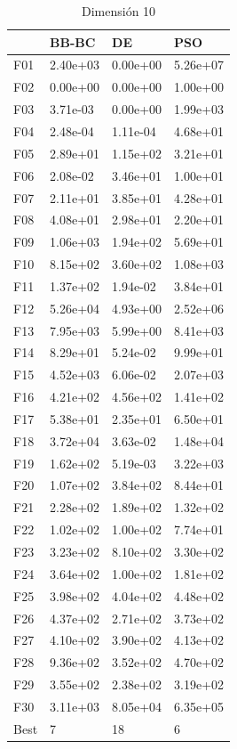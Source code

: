 \begin{table}[H]
    \begin{minipage}{.5\linewidth}
      \caption{Dimensión 10}
      \centering
      \begin{tabular}{llll}
        \toprule
        {} &     BB-BC &        DE &       PSO \\
        \midrule
        F01  &  2.40e+03 &  0.00e+00 &  5.26e+07 \\
        F02  &  0.00e+00 &  0.00e+00 &  1.00e+00 \\
        F03  &  3.71e-03 &  0.00e+00 &  1.99e+03 \\
        F04  &  2.48e-04 &  1.11e-04 &  4.68e+01 \\
        F05  &  2.89e+01 &  1.15e+02 &  3.21e+01 \\
        F06  &  2.08e-02 &  3.46e+01 &  1.00e+01 \\
        F07  &  2.11e+01 &  3.85e+01 &  4.28e+01 \\
        F08  &  4.08e+01 &  2.98e+01 &  2.20e+01 \\
        F09  &  1.06e+03 &  1.94e+02 &  5.69e+01 \\
        F10  &  8.15e+02 &  3.60e+02 &  1.08e+03 \\
        F11  &  1.37e+02 &  1.94e-02 &  3.84e+01 \\
        F12  &  5.26e+04 &  4.93e+00 &  2.52e+06 \\
        F13  &  7.95e+03 &  5.99e+00 &  8.41e+03 \\
        F14  &  8.29e+01 &  5.24e-02 &  9.99e+01 \\
        F15  &  4.52e+03 &  6.06e-02 &  2.07e+03 \\
        F16  &  4.21e+02 &  4.56e+02 &  1.41e+02 \\
        F17  &  5.38e+01 &  2.35e+01 &  6.50e+01 \\
        F18  &  3.72e+04 &  3.63e-02 &  1.48e+04 \\
        F19  &  1.62e+02 &  5.19e-03 &  3.22e+03 \\
        F20  &  1.07e+02 &  3.84e+02 &  8.44e+01 \\
        F21  &  2.28e+02 &  1.89e+02 &  1.32e+02 \\
        F22  &  1.02e+02 &  1.00e+02 &  7.74e+01 \\
        F23  &  3.23e+02 &  8.10e+02 &  3.30e+02 \\
        F24  &  3.64e+02 &  1.00e+02 &  1.81e+02 \\
        F25  &  3.98e+02 &  4.04e+02 &  4.48e+02 \\
        F26  &  4.37e+02 &  2.71e+02 &  3.73e+02 \\
        F27  &  4.10e+02 &  3.90e+02 &  4.13e+02 \\
        F28  &  9.36e+02 &  3.52e+02 &  4.70e+02 \\
        F29  &  3.55e+02 &  2.38e+02 &  3.19e+02 \\
        F30  &  3.11e+03 &  8.05e+04 &  6.35e+05 \\
        Best &         7 &        18 &         6 \\
        \bottomrule
        \end{tabular}
        

\end{minipage}
\end{table}

